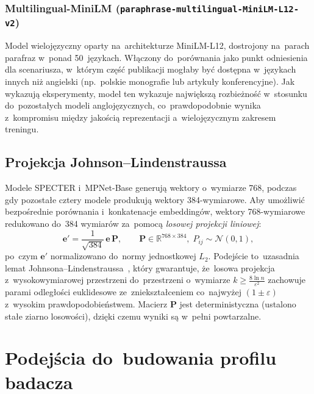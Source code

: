 \subsubsection{Multilingual-MiniLM (\texttt{paraphrase-multilingual-MiniLM-L12-v2})}

Model wielojęzyczny oparty na~architekturze MiniLM-L12,
dostrojony na~parach parafraz w~ponad 50~językach.
Włączony do~porównania jako punkt odniesienia dla scenariusza,
w~którym część publikacji mogłaby być dostępna w~językach innych
niż angielski (np.\ polskie monografie lub artykuły konferencyjne).
Jak wykazują eksperymenty, model ten wykazuje największą
rozbieżność w~stosunku do~pozostałych modeli anglojęzycznych,
co~prawdopodobnie wynika z~kompromisu między jakością
reprezentacji a~wielojęzycznym zakresem treningu.

\subsection{Projekcja Johnson--Lindenstraussa}
\label{subsec:jl}

Modele SPECTER i~MPNet-Base generują wektory o~wymiarze 768,
podczas gdy pozostałe cztery modele produkują wektory 384-wymiarowe.
Aby umożliwić bezpośrednie porównania i~konkatenacje embeddingów,
wektory 768-wymiarowe redukowano do~384 wymiarów za~pomocą
\emph{losowej projekcji liniowej}:
\begin{equation}
    \mathbf{e}' = \frac{1}{\sqrt{384}}\,\mathbf{e}\,\mathbf{P},
    \qquad \mathbf{P} \in \mathbb{R}^{768 \times 384},\;
    P_{ij} \sim \mathcal{N}(0,1),
    \label{eq:jl_proj}
\end{equation}
po~czym $\mathbf{e}'$ normalizowano do~normy jednostkowej $L_2$.
Podejście to~uzasadnia lemat Johnsona--Lindenstraussa~\cite{jl1984},
który gwarantuje, że~losowa projekcja z~wysokowymiarowej przestrzeni
do~przestrzeni o~wymiarze $k \geq \frac{8 \ln n}{\varepsilon^2}$
zachowuje parami odległości euklidesowe ze~zniekształceniem
co~najwyżej $(1 \pm \varepsilon)$ z~wysokim prawdopodobieństwem.
Macierz $\mathbf{P}$ jest deterministyczna (ustalono stałe ziarno
losowości), dzięki czemu wyniki są w~pełni powtarzalne.

\section{Podejścia do~budowania profilu badacza}
\label{sec:approaches}

